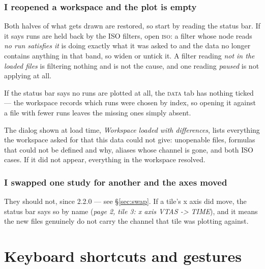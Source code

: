 \documentclass[11pt,a4paper,oneside]{report}
\newcommand{\appver}{2.2.0}
\newcommand{\tab}[1]{\textsc{#1}}
\begin{document}
\subsection{I reopened a workspace and the plot is empty}

Both halves of what gets drawn are restored, so start by reading the status bar.
If it says runs are held back by the ISO filters, open \tab{iso}: a filter whose
node reads \emph{no run satisfies it} is doing exactly what it was asked to and
the data no longer contains anything in that band, so widen or untick it. A
filter reading \emph{not in the loaded files} is filtering nothing and is not
the cause, and one reading \emph{paused} is not applying at all.

If the status bar says no runs are plotted at all, the \tab{data} tab has
nothing ticked --- the workspace records which runs were chosen by index, so
opening it against a file with fewer runs leaves the missing ones simply absent.

The dialog shown at load time, \emph{Workspace loaded with differences}, lists
everything the workspace asked for that this data could not give: unopenable
files, formulas that could not be defined and why, aliases whose channel is
gone, and both ISO cases. If it did not appear, everything in the workspace
resolved.

\subsection{I swapped one study for another and the axes moved}

They should not, since \appver{} --- see \S\ref{sec:swap}. If a tile's x axis
did move, the status bar says so by name (\emph{page 2, tile 3: x axis VTAS ->
TIME}), and it means the new files genuinely do not carry the channel that tile
was plotting against.

\appendix

\chapter{Keyboard shortcuts and gestures}
\end{document}
